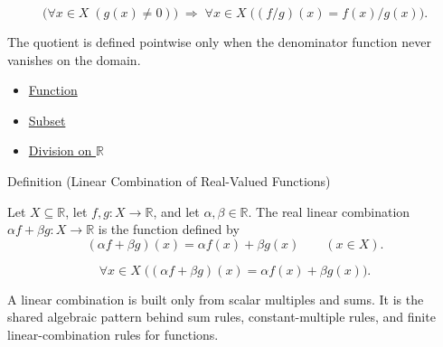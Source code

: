 \begin{remark*}
\[
  \bigl(\forall x\in X\;(g(x)\neq 0)\bigr)
  \;\Longrightarrow\;
  \forall x\in X\;\bigl((f/g)(x)=f(x)/g(x)\bigr).
\]
\end{remark*}

\begin{remark*}[Interpretation]
The quotient is defined pointwise only when the denominator function never
vanishes on the domain.
\end{remark*}

\begin{dependencies}
\begin{itemize}
  \item \hyperref[def:function]{Function}
  \item \hyperref[def:subset]{Subset}
  \item \hyperref[def:division-on-r]{Division on $\mathbb{R}$}
\end{itemize}
\end{dependencies}


\begin{definitionbox}{Definition (Linear Combination of Real-Valued Functions)}
\begin{definition}
\label{def:linear-combination-of-real-valued-functions}
Let $X\subseteq\mathbb{R}$, let $f,g:X\to\mathbb{R}$, and let
$\alpha,\beta\in\mathbb{R}$.  The real linear combination
$\alpha f+\beta g:X\to\mathbb{R}$ is the function defined by
\[
  (\alpha f+\beta g)(x)=\alpha f(x)+\beta g(x)
  \qquad (x\in X).
\]
\end{definition}
\end{definitionbox}

\begin{remark*}
\[
  \forall x\in X\;\bigl((\alpha f+\beta g)(x)=\alpha f(x)+\beta g(x)\bigr).
\]
\end{remark*}

\begin{remark*}[Interpretation]
A linear combination is built only from scalar multiples and sums. It is
the shared algebraic pattern behind sum rules, constant-multiple rules, and
finite linear-combination rules for functions.
\end{remark*}

